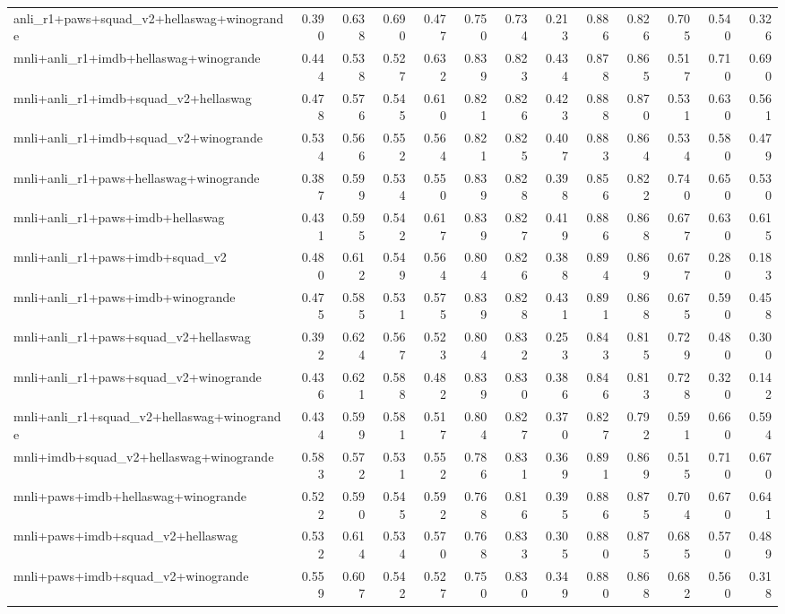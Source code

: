 \begin{table}[t]
\begin{tabular}{lrrrrrrrrrrrr}
    anli\_r1+paws+squad\_v2+hellaswag+winogrande & 0.390 & 0.638 & 0.690 & 0.477 & 0.750 & 0.734 & 0.213 & 0.886 & 0.826 & 0.705 & 0.540 & 0.326 \\
    mnli+anli\_r1+imdb+hellaswag+winogrande & 0.444 & 0.538 & 0.527 & 0.632 & 0.839 & 0.823 & 0.434 & 0.878 & 0.865 & 0.517 & 0.710 & 0.690 \\
    mnli+anli\_r1+imdb+squad\_v2+hellaswag & 0.478 & 0.576 & 0.545 & 0.610 & 0.821 & 0.826 & 0.423 & 0.888 & 0.870 & 0.531 & 0.630 & 0.561 \\
    mnli+anli\_r1+imdb+squad\_v2+winogrande & 0.534 & 0.566 & 0.552 & 0.564 & 0.821 & 0.825 & 0.407 & 0.883 & 0.864 & 0.534 & 0.580 & 0.479 \\
    mnli+anli\_r1+paws+hellaswag+winogrande & 0.387 & 0.599 & 0.534 & 0.550 & 0.839 & 0.828 & 0.398 & 0.856 & 0.822 & 0.740 & 0.650 & 0.530 \\
    mnli+anli\_r1+paws+imdb+hellaswag & 0.431 & 0.595 & 0.542 & 0.617 & 0.839 & 0.827 & 0.419 & 0.886 & 0.868 & 0.677 & 0.630 & 0.615 \\
    mnli+anli\_r1+paws+imdb+squad\_v2 & 0.480 & 0.612 & 0.549 & 0.564 & 0.804 & 0.826 & 0.388 & 0.894 & 0.869 & 0.677 & 0.280 & 0.183 \\
    mnli+anli\_r1+paws+imdb+winogrande & 0.475 & 0.585 & 0.531 & 0.575 & 0.839 & 0.828 & 0.431 & 0.891 & 0.868 & 0.675 & 0.590 & 0.458 \\
    mnli+anli\_r1+paws+squad\_v2+hellaswag & 0.392 & 0.624 & 0.567 & 0.523 & 0.804 & 0.832 & 0.253 & 0.843 & 0.815 & 0.729 & 0.480 & 0.300 \\
    mnli+anli\_r1+paws+squad\_v2+winogrande & 0.436 & 0.621 & 0.588 & 0.482 & 0.839 & 0.830 & 0.386 & 0.846 & 0.813 & 0.728 & 0.320 & 0.142 \\
    mnli+anli\_r1+squad\_v2+hellaswag+winogrande & 0.434 & 0.599 & 0.581 & 0.517 & 0.804 & 0.827 & 0.370 & 0.827 & 0.792 & 0.591 & 0.660 & 0.594 \\
    mnli+imdb+squad\_v2+hellaswag+winogrande & 0.583 & 0.572 & 0.531 & 0.552 & 0.786 & 0.831 & 0.369 & 0.891 & 0.869 & 0.515 & 0.710 & 0.670 \\
    mnli+paws+imdb+hellaswag+winogrande & 0.522 & 0.590 & 0.545 & 0.592 & 0.768 & 0.816 & 0.395 & 0.886 & 0.875 & 0.704 & 0.670 & 0.641 \\
    mnli+paws+imdb+squad\_v2+hellaswag & 0.532 & 0.614 & 0.534 & 0.570 & 0.768 & 0.833 & 0.305 & 0.880 & 0.875 & 0.685 & 0.570 & 0.489 \\
    mnli+paws+imdb+squad\_v2+winogrande & 0.559 & 0.607 & 0.542 & 0.527 & 0.750 & 0.830 & 0.349 & 0.880 & 0.868 & 0.682 & 0.560 & 0.318 \\

\end{tabular}
\end{table}
